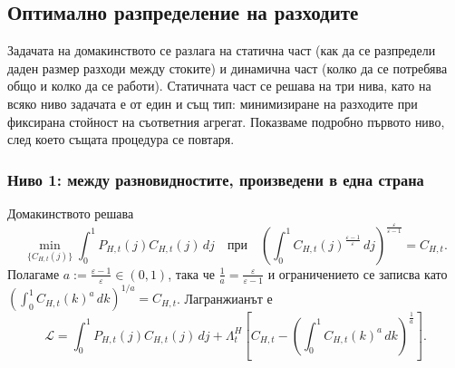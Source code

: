 \subsection{Оптимално разпределение на разходите}

Задачата на домакинството се разлага на статична част (как да се разпредели даден размер разходи между стоките) и динамична част (колко да се потребява общо и колко да се работи). Статичната част се решава на три нива, като на всяко ниво задачата е от един и същ тип: минимизиране на разходите при фиксирана стойност на съответния агрегат. Показваме подробно първото ниво, след което същата процедура се повтаря.

\subsubsection*{Ниво 1: между разновидностите, произведени в една страна}

Домакинството решава
\begin{equation}
\min_{\{C_{H,t}(j)\}} \int_0^1 P_{H,t}(j) C_{H,t}(j)\, dj
\quad \text{при} \quad
\left( \int_0^1 C_{H,t}(j)^{\frac{\varepsilon-1}{\varepsilon}}\, dj \right)^{\frac{\varepsilon}{\varepsilon-1}} = C_{H,t}.
\label{eq:level1_problem}
\end{equation}
Полагаме $a := \frac{\varepsilon-1}{\varepsilon} \in (0,1)$, така че $\frac{1}{a} = \frac{\varepsilon}{\varepsilon-1}$ и ограничението се записва като $\left( \int_0^1 C_{H,t}(k)^a\, dk \right)^{1/a} = C_{H,t}$. Лагранжианът е
\begin{equation}
\mathcal{L} = \int_0^1 P_{H,t}(j) C_{H,t}(j)\, dj
+ \Lambda^{H}_t \left[ C_{H,t} - \left( \int_0^1 C_{H,t}(k)^{a}\, dk \right)^{\frac{1}{a}} \right].
\label{eq:level1_lagrangian}
\end{equation}

